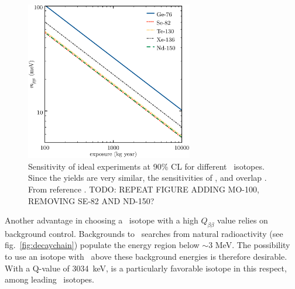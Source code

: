 \begin{figure}[t!b!]
\begin{center}
\includegraphics[width=0.65\textwidth]{img/isotopes_sensi.eps}
\end{center}
\caption{Sensitivity of ideal experiments at 90\% CL for different \bb\ isotopes. Since the yields are very similar, the sensitivities of ,  and  overlap . From reference \cite{Gomez-Cadenas:2010zcc}. TODO: REPEAT FIGURE ADDING MO-100, REMOVING SE-82 AND ND-150?} \label{fig:SensiIdeal}	
\end{figure}

Another advantage in choosing a \bb\ isotope with a high $Q_{\beta\beta}$ value relies on background control. Backgrounds to \bbonu\ searches from natural radioactivity (see fig.~\ref{fig:decaychain}) populate the energy region below $\sim$3 MeV. The possibility to use an isotope with \Qbb\ above these background energies is therefore desirable. With a Q-value of 3034~keV,  is a particularly favorable isotope in this respect, among leading \bb\ isotopes.


